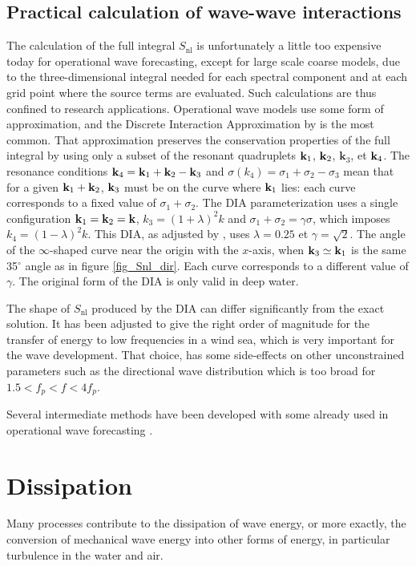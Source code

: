 \subsection{Practical calculation of wave-wave interactions}
The calculation of the full integral $S_{\mathrm{nl}}$ is unfortunately a little too expensive today for operational wave forecasting, 
except for large scale coarse models, due to the three-dimensional integral needed for each spectral component and at each grid point where the 
source terms are evaluated. Such calculations are thus confined to research applications. Operational wave models use some form of approximation, and the Discrete 
Interaction Approximation by \cite{Hasselmann&al.1985} is the most common. That approximation preserves the conservation properties of the full integral 
by using only a subset of the resonant quadruplets  $\mathbf{k}_1$,  $\mathbf{k}_2$, ${\mathbf
k}_3$, et $\mathbf{k}_4$. 
The resonance conditions $\mathbf{k}_4=\mathbf{k}_1+\mathbf{k}_2-\mathbf{k}_3$ and $\sigma\left(k_4\right)=\sigma_1+\sigma_2-\sigma_3$ 
mean that for a given $\mathbf{k}_1+\mathbf{k}_2$, $\mathbf{k}_3$ must be on the curve where $\mathbf{k}_1$ lies: each curve corresponds to a fixed value of $\sigma_1 + \sigma_2$.
The DIA parameterization uses a single configuration  ${\mathbf
k}_1=\mathbf{k}_2=\mathbf{k}$, $k_3 = (1+\lambda)^2 k$ and
$\sigma_1+\sigma_2=\gamma \sigma$, which imposes $k_4 =
(1-\lambda)^2 k$. This DIA, as adjusted by \cite{Hasselmann&al.1985b}, uses  $\lambda=0.25$ et $\gamma
= \sqrt{2}$. 
The angle of the $\infty$-shaped curve near the origin with the $x$-axis, when $\mathbf{k}_3 \simeq \mathbf{k}_1$ is the same 35$^{\circ}$ angle as in figure \ref{fig_Snl_dir}. Each 
curve corresponds to a different value of $\gamma$.
The original form of the DIA is only valid in deep water. 

The shape of  $S_{\mathrm{nl}}$ produced by the DIA can differ significantly from the exact solution. It has been adjusted to give the right order 
of magnitude for the transfer of energy to low frequencies in a wind sea, which is very important for the wave development. That choice, has some side-effects on other unconstrained
parameters such as the directional wave distribution which is too broad for  $1.5 <f_p <f<4 f_p$.

Several intermediate methods have been developed with some already used in operational wave forecasting \citep[e.g.][]{Komatsu&Masuda1996}. 


\section{Dissipation\label{section_whitecap}}
Many processes contribute to the dissipation of wave energy, or more exactly, the conversion of 
mechanical wave energy into other forms of energy, in particular turbulence in the water and air. 

